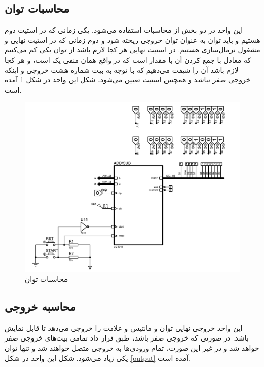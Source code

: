 \documentclass{article}
\begin{document}
\subsection{محاسبات توان}
این واحد در دو بخش از محاسبات استفاده می‌شود.
یکی زمانی که در استیت دوم هستیم و باید توان به عنوان توان خروجی ریخته شود و دوم زمانی که در استیت نهایی و مشغول نرمال‌سازی هستیم.
در استیت نهایی هر کجا لازم باشد از توان یکی کم می‌کنیم که معادل با جمع کردن آن با مقدار  است که در واقع همان منفی یک است، و هر کجا لازم باشد آن را شیفت می‌دهیم که با توجه به بیت شماره هشت خروجی و اینکه خروجی صفر نباشد و همچنین استیت تعیین می‌شود.
شکل این واحد در شکل \ref{power} آمده است.
\begin{figure}
	\centering
	\includegraphics[scale=0.6, page=9]{./graphics/graphics}
	\caption{محاسبات توان}
	\label{power}
\end{figure}

\subsection{محاسبه خروجی}
این واحد خروجی نهایی توان و مانتیس و علامت را خروجی می‌دهد تا قابل نمایش باشد.
در صورتی که خروجی صفر باشد، طبق قرار داد تمامی بیت‌های خروجی صفر خواهد شد و در غیر این صورت، تمام ورودی‌ها به خروجی متصل خواهند شد و تنها توان یکی زیاد می‌شود. شکل این واحد در شکل \ref{output} آمده است.
\end{document}
